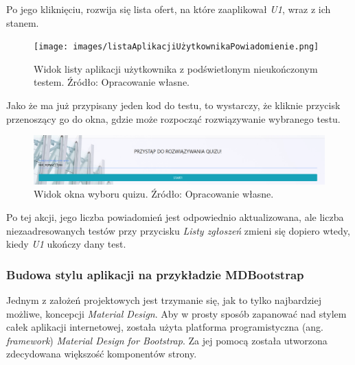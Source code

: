 \documentclass[twoside]{projektInzynierskiMS}
\numberwithin{figure}{section}
\begin{document}
Po jego kliknięciu, rozwija się lista ofert, na które zaaplikował \textit{U1}, wraz z ich stanem.

\newpage

\begin{figure}[h!]
    \centering
    \texttt{[image: images/listaAplikacjiUżytkownikaPowiadomienie.png]}
    \caption{Widok listy aplikacji użytkownika z podświetlonym nieukończonym testem. Źródło: Opracowanie własne.}
    \label{fig:lista_aplikacji_użytkownika_powiadomienie}
\end{figure}

Jako że ma już przypisany jeden kod do testu, to wystarczy, że kliknie przycisk przenoszący go do okna, gdzie może rozpocząć rozwiązywanie wybranego testu. 

\begin{figure}[h!]
    \centering
    \includegraphics[width = \textwidth]{images/PanelQuizu.png}
    \caption{Widok okna wyboru quizu. Źródło: Opracowanie własne.}
    \label{fig:okno_wyboru_quizu}
\end{figure}

Po tej akcji, jego liczba powiadomień jest odpowiednio aktualizowana, ale liczba niezaadresowanych testów przy przycisku \textit{Listy zgłoszeń} zmieni się dopiero wtedy, kiedy \textit{U1} ukończy dany test.

\subsubsection{Budowa stylu aplikacji na przykładzie MDBootstrap}
Jednym z założeń projektowych jest trzymanie się, jak to tylko najbardziej możliwe, koncepcji \textit{Material Design}. Aby w prosty sposób zapanować nad stylem całek aplikacji internetowej, została użyta platforma programistyczna (ang. \textit{framework}) \textit{Material Design for Bootstrap}. Za jej pomocą została utworzona zdecydowana większość komponentów strony.

\newpage
\end{document}
